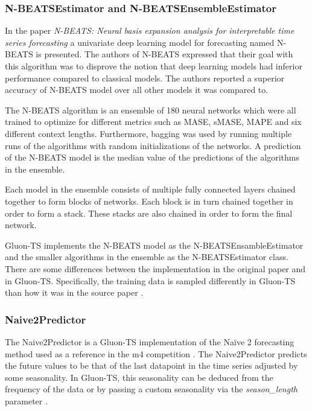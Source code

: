 \subsubsection{N-BEATSEstimator and N-BEATSEnsembleEstimator}
\label{algo:nbeats}
In the paper \textit{N-BEATS: Neural basis expansion analysis for interpretable time series forecasting} \cite{oreshkin_n_beats_2020} a univariate deep learning model for forecasting named N-BEATS is presented. The authors of N-BEATS expressed that their goal with this algorithm was to disprove the notion that deep learning models had inferior performance compared to classical models. The authors reported a superior accuracy of N-BEATS model over all other models it was compared to.

The N-BEATS algorithm is an ensemble of 180 neural networks which were all trained to optimize for different metrics such as MASE, sMASE, MAPE and six different context lengths. Furthermore, bagging was used by running multiple runs of the algorithms with random initializations of the networks. A prediction of the N-BEATS model is the median value of the predictions of the algorithms in the ensemble.

Each model in the ensemble consists of multiple fully connected layers chained together to form blocks of networks. Each block is in turn chained together in order to form a stack. These stacks are also chained in order to form the final network.

Gluon-TS implements the N-BEATS model as the N-BEATSEnsambleEstimator and the smaller algorithms in the ensemble as the N-BEATSEstimator class. There are some differences between the implementation in the original paper and in Gluon-TS. Specifically, the training data is sampled differently in Gluon-TS than how it was in the source paper \cite{gluonts-website}.

\subsubsection{Naive2Predictor}
\label{model:naive2}
The Naive2Predictor is a Gluon-TS implementation of the Naïve 2 forecasting method used as a reference in the m4 competition \cite{makridakis_m4_2020}. The Naive2Predictor predicts the future values to be that of the last datapoint in the time series adjusted by some seasonality. In Gluon-TS, this seasonality can be deduced from the frequency of the data or by passing a custom seasonality via the \textit{season\_length} parameter \cite{gluonts-website}.

